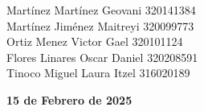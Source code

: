 \documentclass[12pt]{article}
\begin{document}
\begin{titlepage}
    \vspace{0.2cm}
    \small                      
    \begin{center}
        Martínez Martínez Geovani 320141384\\
        Martínez Jiménez Maitreyi 320099773\\
        Ortiz Menez Victor Gael 320101124\\
        Flores Linares Oscar Daniel 320208591\\
        Tinoco Miguel Laura Itzel 316020189\\
       
    \end{center}
    \vspace{2cm} 
    
    \textbf{15 de Febrero de 2025}
\end{titlepage}

\item 
\item 
\item 
\item 
    
\end{document}
